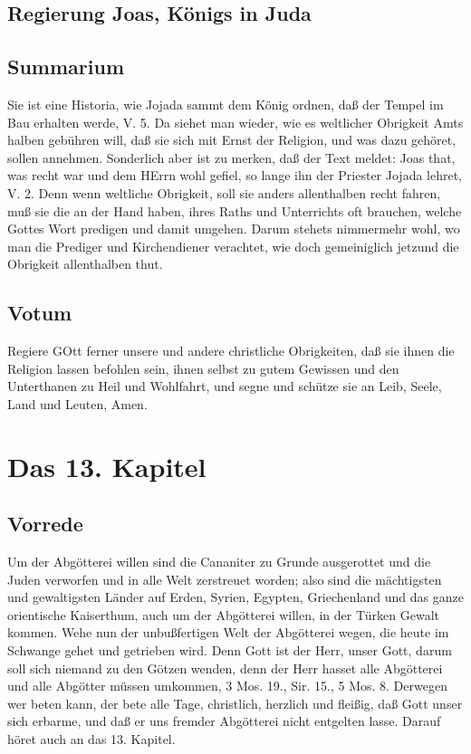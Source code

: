 \section{Regierung Joas, Königs in Juda}

\section{Summarium}

Sie ist eine Historia, wie Jojada sammt dem König ordnen, daß der Tempel im Bau erhalten werde, V. 5. Da siehet man wieder, wie es weltlicher Obrigkeit Amts halben gebühren will, daß sie sich mit Ernst der Religion, und was dazu gehöret, sollen annehmen. Sonderlich aber ist zu merken, daß der Text meldet: Joas that, was recht war und dem HErrn wohl gefiel, so lange ihn der Priester Jojada lehret, V. 2. Denn wenn weltliche Obrigkeit, soll sie anders allenthalben recht fahren, muß sie die an der Hand haben, ihres Raths und Unterrichts oft brauchen, welche Gottes Wort predigen und damit umgehen. Darum stehets nimmermehr wohl, wo man die Prediger und Kirchendiener verachtet, wie doch gemeiniglich jetzund die Obrigkeit allenthalben thut.

\section{Votum}

Regiere GOtt ferner unsere und andere christliche Obrigkeiten, daß sie ihnen die Religion lassen befohlen sein, ihnen selbst zu gutem Gewissen und den Unterthanen zu Heil und Wohlfahrt, und segne und schütze sie an Leib, Seele, Land und Leuten, Amen.

\chapter{Das 13. Kapitel}

\section{Vorrede}

Um der Abgötterei willen sind die Cananiter zu Grunde ausgerottet und die Juden verworfen und in alle Welt zerstreuet worden; also sind die mächtigsten und gewaltigsten Länder auf Erden, Syrien, Egypten, Griechenland und das ganze orientische Kaiserthum, auch um der Abgötterei willen, in der Türken Gewalt kommen. Wehe nun der unbußfertigen Welt der Abgötterei wegen, die heute im Schwange gehet und getrieben wird. Denn Gott ist der Herr, unser Gott, darum soll sich niemand zu den Götzen wenden, denn der Herr hasset alle Abgötterei und alle Abgötter müssen umkommen, 3 Mos. 19., Sir. 15., 5 Mos. 8. Derwegen wer beten kann, der bete alle Tage, christlich, herzlich und fleißig, daß Gott unser sich erbarme, und daß er uns fremder Abgötterei nicht entgelten lasse. Darauf höret auch an das 13. Kapitel.

